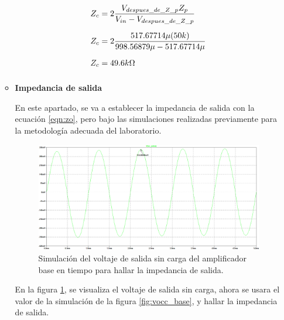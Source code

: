 \begin{enumerate}
\begin{itemize}
                \begin{align*}
                  Z_{c} & =2\dfrac{V_{despues\_de\_Z\_p}Z_p}{V_{in}-V_{despues\_de\_Z\_p}} \\[0.2cm]
                  Z_{c} & =2\dfrac{517.67714\mu(50k)}{998.56879\mu-517.67714\mu}           \\[0.2cm]
                  Z_{c} & =49.6k\ohm                                                       \\[0.2cm]
                \end{align*}

          \item  \textbf{Impedancia de salida}

                En este apartado, se va a establecer la impedancia de salida con la ecuación \ref{eqn:zo}, pero bajo las simulaciones realizadas previamente para la metodología adecuada del laboratorio.

                \begin{figure}[H]
                  \centering
                  \includegraphics[width=\textwidth]{Imagenes/vosc_base.png}
                  \caption{Simulación del voltaje de salida sin carga del amplificador base en tiempo para hallar la impedancia de salida.}
                  \label{fig:vosc_base}
                \end{figure}

                En la figura \ref{fig:vosc_base}, se visualiza el voltaje de salida sin carga, ahora se usara el valor de la simulación de la figura \ref{fig:vocc_base}, y hallar la impedancia de salida.


\end{itemize}
\end{enumerate}
